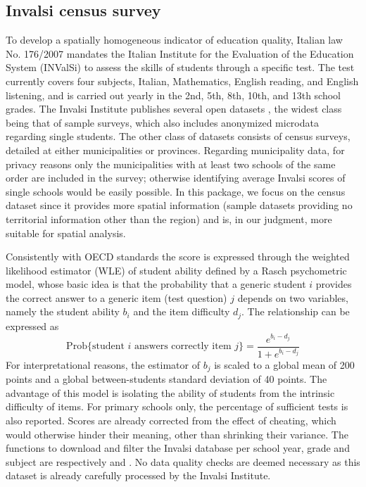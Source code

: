 \documentclass[openany]{book}
\begin{document}
\subsection{Invalsi census survey} \label{par:Invalsi}
To develop a spatially homogeneous indicator of education quality, Italian law No. 176/2007 \citep{InvalsiLaw} mandates the Italian Institute for the Evaluation of the Education System (INValSi) to assess the skills of students through a specific test. The test currently covers four subjects, Italian, Mathematics, English reading, and English listening, and is carried out yearly in the 2nd, 5th, 8th, 10th, and 13th school grades. 
The Invalsi Institute publishes several open datasets \citep{Invalsi_IS}, the widest class being that of sample surveys, which also includes anonymized microdata regarding single students. The other class of datasets consists of census surveys, detailed at either municipalities or provinces. Regarding municipality data, for privacy reasons only the municipalities with at least two schools of the same order are included in the survey; otherwise identifying average Invalsi scores of single schools would be easily possible. In this package, we focus on the census dataset since it provides more spatial information (sample datasets providing no territorial information other than the region) and is, in our judgment, more suitable for spatial analysis.  

Consistently with OECD standards \citep{PISA} the score is expressed through the weighted likelihood estimator (WLE) of student ability defined by a Rasch psychometric model, whose basic idea is that the probability that a generic student $i$ provides the correct answer to a generic item (test question) $j$ depends on two variables, namely the student ability $b_i$ and the item difficulty $d_j$. The relationship can be expressed as
$$
\mathrm{Prob} \lbrace \text{student } i \text{ answers correctly item } j \rbrace= \frac{e^{b_i - d_j}}{1 + e^{b_i - d_j}}
$$
For interpretational reasons, the estimator of $b_j$ is scaled to a global mean of 200 points and a global between-students standard deviation of 40 points. The advantage of this model is isolating the ability of students from the intrinsic difficulty of items. For primary schools only, the percentage of sufficient tests is also reported. Scores are already corrected from the effect of cheating, which would otherwise hinder their meaning, other than shrinking their variance. The functions to download and filter the Invalsi database per school year, grade and subject are respectively \texttt{} and \texttt{}. No data quality checks are deemed necessary as this dataset is already carefully processed by the Invalsi Institute.
\end{document}
